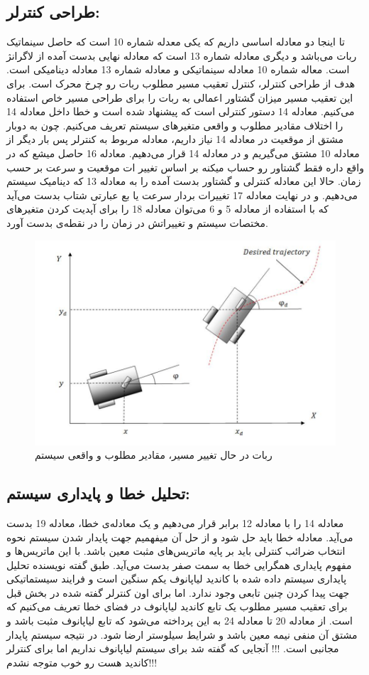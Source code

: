 \subsection{طراحی کنترلر:}
تا اینجا دو معادله اساسی داریم که یکی معدله شماره 10 است که حاصل سینماتیک ربات می‌باشد و دیگری معادله شماره 13 است که معادله نهایی بدست آمده از لاگرانژ است. معاله شماره 10 معادله سینماتیکی و معادله شماره 13 معادله دینامیکی است.
هدف از طراحی کنترلر، کنترل تعقیب مسیر مطلوب ربات رو چرخ محرک است.
برای این تعقیب مسیر میزان گشتاور اعمالی به ربات را برای طراحی مسیر خاص استفاده می‌کنیم.
معادله 14 دستور کنترلی است که پیشنهاد شده است و خطا داخل معادله 14 را اختلاف مقادیر مطلوب و واقعی متغیرهای سیستم تعریف می‌کنیم.
چون به دوبار مشتق از موقعیت در معادله 14 نیاز داریم، معادله مربوط به کنترلر پس بار دیگر از معادله 10 مشتق می‌گیریم و در معادله 14 قرار می‌دهیم. معادله 16 حاصل میشع که در واقع داره فقط گشتاور رو حساب میکنه بر اساس تغییر ات موقعیت و سرعت بر حسب زمان. حالا این معادله کنترلی و گشتاور بدست آمده را به معادله 13 که دینامیک سیستم می‌دهیم. و در نهایت معادله 17 تغییرات بردار سرعت یا بع عبارتی شتاب بدست می‌آید که با استفاده از معادله 5 و 6 می‌توان معادله 18 را برای آپدیت کردن متغیرهای مختصات سیستم و تغییراتش در زمان را در نقطه‌ی 
بدست آورد.
\begin{figure}[h]
	\centering
	\includegraphics[width=0.7\linewidth]{images/2}
	\caption{ربات در حال تغییر مسیر، مقادیر مطلوب و واقعی سیستم}
	\label{fig:2}
\end{figure}
\noindent\unskip

\subsection{تحلیل خطا و پایداری سیستم:}
معادله 14 را با معادله 12 برابر قرار می‌دهیم و یک معادله‌ی خطا، معادله 19 بدست می‌آید. معادله خطا باید حل شود و از حل آن میفهمیم جهت پایدار شدن سیستم نحوه انتخاب ضرائب کنترلی باید بر پایه ماتریس‌های مثبت معین باشد. با این ماتریس‌ها و مفهوم پایداری همگرایی خطا به سمت صفر بدست می‌آید.
طبق گفته نویسنده تحلیل پایداری سیستم داده شده با کاندید لیاپانوف یکم سنگین است و فرایند سیستماتیکی جهت پیدا کردن چنین تابعی وجود ندارد.
اما برای اون کنترلر گفته شده در بخش قبل برای تعقیب مسیر مطلوب یک تابع کاندید لیاپانوف در فضای خطا تعریف می‌کنیم که 
است. از معادله 20 تا معادله 24 به این پرداخته می‌شود که تابع لیاپانوف مثبت باشد و مشتق آن منفی نیمه معین باشد و شرایط سیلوستر ارضا شود. در نتیجه سیستم پایدار مجانبی است.
!!! آنجایی که گفته شد برای سیستم لیاپانوف نداریم اما برای کنترلر کاندید هست رو خوب متوجه نشدم!!!

